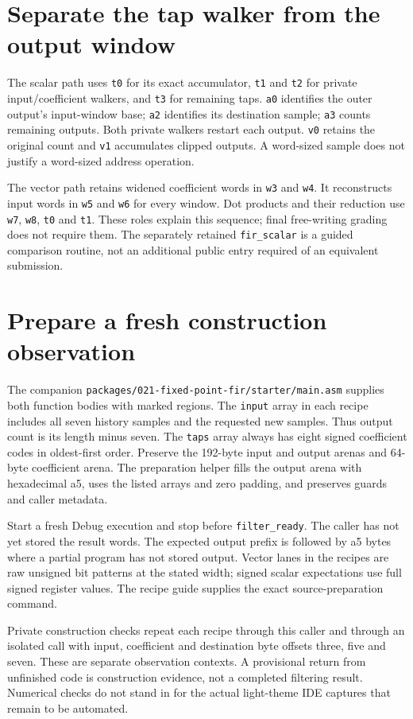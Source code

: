 \section{Separate the tap walker from the output window}
The scalar path uses \texttt{t0} for its exact accumulator, \texttt{t1} and
\texttt{t2} for private input/coefficient walkers, and \texttt{t3} for remaining taps.
\texttt{a0} identifies the outer output's input-window base; \texttt{a2} identifies
its destination sample; \texttt{a3} counts remaining outputs. Both private walkers
restart each output. \texttt{v0} retains the original count and \texttt{v1} accumulates
clipped outputs. A word-sized sample does not justify a word-sized address operation.

The vector path retains widened coefficient words in \texttt{w3} and \texttt{w4}.
It reconstructs input words in \texttt{w5} and \texttt{w6} for every window. Dot
products and their reduction use \texttt{w7}, \texttt{w8}, \texttt{t0} and \texttt{t1}.
These roles explain this sequence; final free-writing grading does not require them.
The separately retained \texttt{fir\_scalar} is a guided comparison routine, not an
additional public entry required of an equivalent submission.

\section{Prepare a fresh construction observation}
The companion \texttt{packages/021-fixed-point-fir/starter/main.asm} supplies both function bodies
with marked regions. The \texttt{input} array in each recipe includes all seven
history samples and the requested new samples. Thus output count is its length minus
seven. The \texttt{taps} array always has eight signed coefficient codes in oldest-first
order. Preserve the 192-byte input and output arenas and 64-byte coefficient arena.
The preparation helper fills the output arena with hexadecimal a5, uses the listed
arrays and zero padding, and preserves guards and caller metadata.

Start a fresh Debug execution and stop before \texttt{filter\_ready}. The caller has
not yet stored the result words. The expected output prefix is followed by a5 bytes
where a partial program has not stored output. Vector lanes in the recipes are raw
unsigned bit patterns at the stated width; signed scalar expectations use full signed
register values. The recipe guide supplies the exact source-preparation command.

Private construction checks repeat each recipe through this caller and through an
isolated call with input, coefficient and destination byte offsets three, five and
seven. These are separate observation contexts. A provisional return from unfinished
code is construction evidence, not a completed filtering result. Numerical checks do
not stand in for the actual light-theme IDE captures that remain to be automated.

